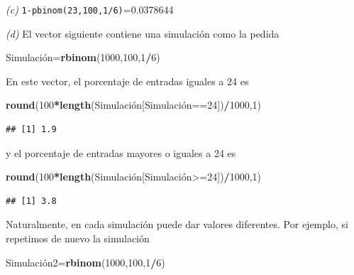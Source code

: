 \documentclass[]{book}
\newenvironment{Shaded}{\begin{snugshade}}{\end{snugshade}}
\newcommand{\DecValTok}[1]{\textcolor[rgb]{0.00,0.00,0.81}{#1}}
\newcommand{\KeywordTok}[1]{\textcolor[rgb]{0.13,0.29,0.53}{\textbf{#1}}}
\newcommand{\NormalTok}[1]{#1}
\newcommand{\OperatorTok}[1]{\textcolor[rgb]{0.81,0.36,0.00}{\textbf{#1}}}
\theoremstyle{definition}
\theoremstyle{definition}
\theoremstyle{definition}
\theoremstyle{remark}
\begin{document}
\emph{(c)} \texttt{1-pbinom(23,100,1/6)}=0.0378644

\emph{(d)} El vector siguiente contiene una simulación como la pedida

\begin{Shaded}
\begin{Highlighting}[]
\NormalTok{Simulación=}\KeywordTok{rbinom}\NormalTok{(}\DecValTok{1000}\NormalTok{,}\DecValTok{100}\NormalTok{,}\DecValTok{1}\OperatorTok{/}\DecValTok{6}\NormalTok{)}
\end{Highlighting}
\end{Shaded}

En este vector, el porcentaje de entradas iguales a 24 es

\begin{Shaded}
\begin{Highlighting}[]
\KeywordTok{round}\NormalTok{(}\DecValTok{100}\OperatorTok{*}\KeywordTok{length}\NormalTok{(Simulación[Simulación==}\DecValTok{24}\NormalTok{])}\OperatorTok{/}\DecValTok{1000}\NormalTok{,}\DecValTok{1}\NormalTok{)}
\end{Highlighting}
\end{Shaded}

\begin{verbatim}
## [1] 1.9
\end{verbatim}

y el porcentaje de entradas mayores o iguales a 24 es

\begin{Shaded}
\begin{Highlighting}[]
\KeywordTok{round}\NormalTok{(}\DecValTok{100}\OperatorTok{*}\KeywordTok{length}\NormalTok{(Simulación[Simulación>=}\DecValTok{24}\NormalTok{])}\OperatorTok{/}\DecValTok{1000}\NormalTok{,}\DecValTok{1}\NormalTok{)}
\end{Highlighting}
\end{Shaded}

\begin{verbatim}
## [1] 3.8
\end{verbatim}

Naturalmente, en cada simulación puede dar valores diferentes. Por ejemplo, si repetimos de nuevo la simulación

\begin{Shaded}
\begin{Highlighting}[]
\NormalTok{Simulación2=}\KeywordTok{rbinom}\NormalTok{(}\DecValTok{1000}\NormalTok{,}\DecValTok{100}\NormalTok{,}\DecValTok{1}\OperatorTok{/}\DecValTok{6}\NormalTok{)}
\end{Highlighting}
\end{Shaded}
\end{document}
